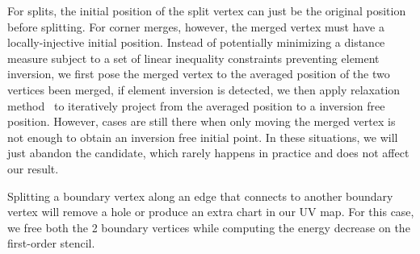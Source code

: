 For splits, the initial position of the split vertex can just be the original position before splitting. For corner merges, however, the merged vertex must have a locally-injective initial position. Instead of potentially minimizing a distance measure subject to a set of linear inequality constraints preventing element inversion, we first pose the merged vertex to the averaged position of the two vertices been merged, if element inversion is detected, we then apply relaxation method~\cite{Agmon1954Relaxation} to iteratively project from the averaged position to a inversion free position.  However, cases are still there when only moving the merged vertex is not enough to obtain an inversion free initial point. In these situations, we will just abandon the candidate, which rarely happens in practice and does not affect our result.

Splitting a boundary vertex along an edge that connects to another boundary vertex will remove a hole or produce an extra chart in our UV map. For this case, we free both the 2 boundary vertices while computing the energy decrease on the first-order stencil. 